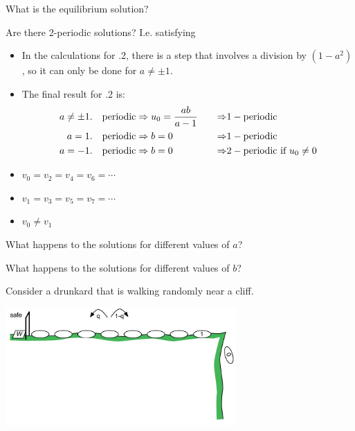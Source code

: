 	\begin{parts}
		\item What is the equilibrium solution?
		\item Are there 2-periodic solutions? I.e. satisfying
\begin{annotation}
	\begin{goals}
		\begin{itemize}
			\item In the calculations for .2, there is a step that involves a division by $(1-a^2)$, so it can only be done for $a \neq \pm 1$.
			\item The final result for .2 is:
			\begin{align*}
				a \neq \pm1. & \quad {\rm periodic} \Rightarrow u_0 = \frac{ab}{a-1} \quad & \Rightarrow & 1-{\rm periodic} \\
				a = 1. & \quad {\rm periodic} \Rightarrow b=0  & \Rightarrow & 1-{\rm periodic} \\
				a = -1. & \quad {\rm periodic} \Rightarrow b=0  & \Rightarrow & 2-\text{periodic if } u_0\neq 0
			\end{align*}
		\end{itemize}
	\end{goals}
\end{annotation}
		\begin{itemize}
			\item $v_0=v_2=v_4=v_6=\cdots$
			\item $v_1=v_3=v_5=v_7=\cdots$
			\item $v_0\neq v_1$
		\end{itemize} 
		\item What happens to the solutions for different values of $a$?
		\item What happens to the solutions for different values of $b$?
	\end{parts}






\bookonlynewpage

\question
	Consider a drunkard that is walking randomly near a cliff.

	\hfill \includegraphics*[width=250pt]{images/module26-drunk.pdf}
	\vspace{-70pt}

